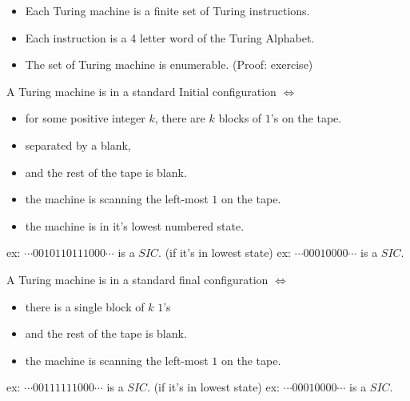 \begin{remark}
\begin{itemize}
\item Each Turing machine is a finite set of Turing instructions.
\item Each instruction is a 4 letter word of the Turing Alphabet.
\item The set of Turing machine is enumerable. (Proof: exercise)

\end{itemize}
\end{remark}

\begin{definition}
A Turing machine is in a standard Initial configuration $\iff$ 
\begin{itemize}
\item for some positive integer $k$, there are $k$ blocks of $1$'s on the tape. %
\item separated by a blank, %
\item and the rest of the tape is blank. %
\item the machine is scanning the left-most $1$ on the tape.
\item the machine is in it's lowest numbered state.
\end{itemize}
ex: $\cdots0010110111000\cdots$ is a $SIC$. (if it's in lowest state)
ex: $\cdots00010000\cdots$ is a $SIC$.
\end{definition}


\begin{definition}
A Turing machine is in a standard final configuration $\iff$ 
\begin{itemize}
\item there is a single block of $k$ $1$'s
\item and the rest of the tape is blank. 
\item the machine is scanning the left-most $1$ on the tape.
\end{itemize}
ex: $\cdots00111111000\cdots$ is a $SIC$. (if it's in lowest state)
ex: $\cdots00010000\cdots$ is a $SIC$.
\end{definition}


